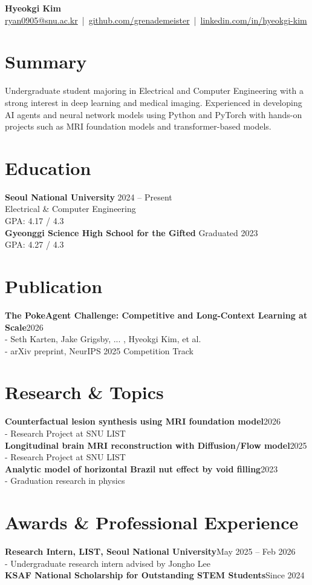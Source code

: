 \documentclass[11pt,a4paper]{article}
\newcommand{\cvitem}[2]{\textbf{#1}\hfill #2\\}
\newcommand{\cvsubitem}[1]{\hspace*{1.2em}#1\\}
\begin{document}
\begin{center}
	{\LARGE\textbf{Hyeokgi Kim}}\\[4pt]
	\href{mailto:ryan0905@snu.ac.kr}{ryan0905@snu.ac.kr}
	\,|\, \href{https://github.com/grenademeister}{github.com/grenademeister}
	\,|\, \href{https://www.linkedin.com/in/hyeokgi-kim-582a14340/}{linkedin.com/in/hyeokgi-kim}
\end{center}

\section*{Summary}
Undergraduate student majoring in Electrical and Computer Engineering with a strong interest in deep learning and
medical imaging. Experienced in developing AI agents and
neural network models using Python and PyTorch with hands-on projects such as MRI foundation models
and transformer-based models.

\section*{Education}
\textbf{Seoul National University} \hfill 2024 -- Present\\
Electrical \& Computer Engineering\\
GPA: 4.17 / 4.3\\[6pt]
\textbf{Gyeonggi Science High School for the Gifted} \hfill Graduated 2023\\
GPA: 4.27 / 4.3

\section*{Publication}
\cvitem{The PokeAgent Challenge: Competitive and Long-Context Learning at Scale}{2026}
\cvsubitem{- Seth Karten, Jake Grigsby, ... , Hyeokgi Kim, et al.}
\cvsubitem{- arXiv preprint, NeurIPS 2025 Competition Track}

\section*{Research \& Topics}
\cvitem{Counterfactual lesion synthesis using MRI foundation model}{2026}
\cvsubitem{- Research Project at SNU LIST}
\cvitem{Longitudinal brain MRI reconstruction with Diffusion/Flow model}{2025}
\cvsubitem{- Research Project at SNU LIST}
\cvitem{Analytic model of horizontal Brazil nut effect by void filling}{2023}
\cvsubitem{- Graduation research in physics}

\section*{Awards \& Professional Experience}
\cvitem{Research Intern, LIST, Seoul National University}{May 2025 -- Feb 2026}
\cvsubitem{- Undergraduate research intern advised by Jongho Lee}
\cvitem{KSAF National Scholarship for Outstanding STEM Students}{Since 2024}
\end{document}
